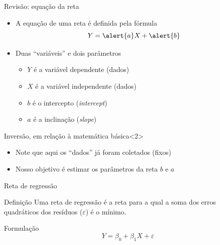 \documentclass{beamer}
\begin{document}
\begin{frame}{Revisão: equação da reta}
  \begin{itemize}
    \small
  \item A equação de uma reta é definida pela fórmula
    \begin{displaymath}
      Y = \alert{a} X + \alert{b}
    \end{displaymath}
  \item Duas ``variáveis'' e dois parâmetros
    \begin{itemize}
      \scriptsize
    \item $Y$ é a variável dependente (dados)
    \item $X$ é a variável independente (dados)
    \item \alert{$b$} é o intercepto ({\it intercept})
    \item \alert{$a$} é a inclinação ({\it slope})
    \end{itemize}
  \end{itemize}
  \bigskip
  \begin{block}{\footnotesize Inversão, em relação à matemática básica}<2>
    \begin{itemize}
    \item Note que aqui os ``dados'' já foram coletados (fixos)
    \item Nosso objetivo é estimar os parâmetros da reta \alert{$b$} e \alert{$a$}
    \end{itemize}
  \end{block}
\end{frame}

\begin{frame}{Reta de regressão}
  \begin{block}{Definição}
    \small Uma \alert{reta de regressão} é a reta para a qual a soma
    dos erros quadráticos dos resíduos ($\varepsilon$) é o mínimo.
  \end{block}
  \bigskip
  \vfill
  \begin{block}{Formulação}
    \footnotesize
    \begin{displaymath}
      Y = \beta_0 + \beta_1 X + \varepsilon
    \end{displaymath}
  \end{block}
\end{frame}
\end{document}
